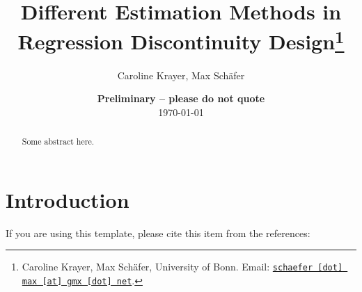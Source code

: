 \documentclass[11pt, a4paper, leqno]{article}
\begin{document}
\title{Different Estimation Methods in Regression Discontinuity Design\thanks{Caroline Krayer, Max Schäfer, University of Bonn. Email: \href{mailto:schaefer.max@gmx.net}{\nolinkurl{schaefer [dot] max [at] gmx [dot] net}}.}}

\author{Caroline Krayer, Max Schäfer}

\date{
{\bf Preliminary -- please do not quote}
\\[1ex]
\today
}

\maketitle


\begin{abstract}
	Some abstract here.
\end{abstract}
\clearpage

\section{Introduction} %
\label{sec:introduction}

If you are using this template, please cite this item from the references: \citet{GaudeckerEconProjectTemplates}











\end{document}
